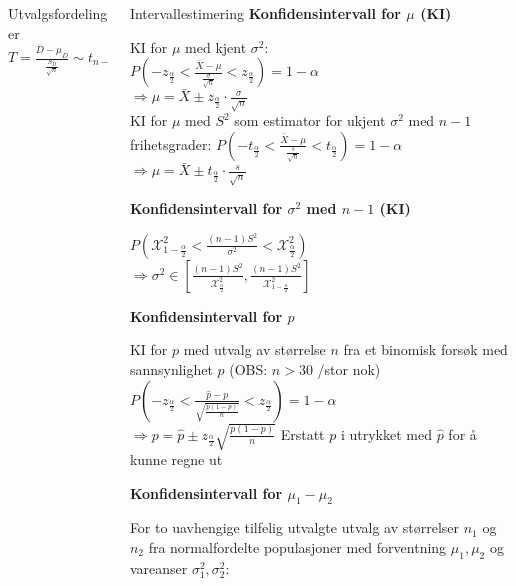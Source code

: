 \documentclass[final,hyperref={pdfpagelabels=false}]{beamer}
\begin{document}
\begin{frame}{}
\begin{columns}[t]
\begin{column}{.25\linewidth}
\begin{block}{\center\normalsize Utvalgsfordelinger}
{					$T=\frac{\bar D - \mu_D}{\frac{S_D}{\sqrt n}}\sim t_{n-1}$
				}
			\end{block}
		\end{column}
		\begin{column}{.25\linewidth}
			\begin{block}{\center Intervallestimering}
				\center\footnotesize\textbf{Konfidensintervall for $\mu$ (KI)}\\
				{\footnotesize\raggedright
					KI for $\mu$ med kjent $\sigma^2$: \\
					$P\left( -z_{\frac{\alpha}{2}} < \frac{\bar X-\mu}{\frac{\sigma}{\sqrt{n}}} < z_{\frac{\alpha}{2}} \right) = 1-\alpha$\\
					$\Rightarrow \mu = \bar X \pm z_{\frac{\alpha}{2}} \cdot\frac{\sigma}{\sqrt{n}}$ \\
					KI for $\mu$ med $S^2$ som estimator for ukjent $\sigma^2$
					med $n-1$ frihetsgrader:
					$P\left( -t_{\frac{\alpha}{2}} < \frac{\bar X-\mu}{\frac{s}{\sqrt{n}}} < t_{\frac{\alpha}{2}} \right) = 1-\alpha $\\ $\Rightarrow \mu = \bar X \pm t_{\frac{\alpha}{2}} \cdot\frac{s}{\sqrt{n}}$ \\
				}
				\center\footnotesize\textbf{Konfidensintervall for $\sigma^2$ med $n-1$ (KI)}\\
				{\footnotesize\raggedright
					$P\left( \mathcal{X}^2_{1-\frac{\alpha}{2}} <\frac{(n-1)S^2}{\sigma^2} < \mathcal{X}^2_{\frac{\alpha}{2}} \right)$ \\
					$\Rightarrow \sigma^2 \in \left[ \frac{(n-1)S^2}{\mathcal{X}^2_{\frac{\alpha}{2}}}, \frac{(n-1)S^2}{\mathcal{X}^2_{1-\frac{\alpha}{2}}} \right]$
				}
				\center\footnotesize\textbf{Konfidensintervall for $p$}\\
				{\footnotesize\raggedright
					KI for $p$ med utvalg av størrelse $n$ fra et binomisk forsøk med sannsynlighet $p$ (OBS: $n>30$ /stor nok)
					$P\left( -z_{\frac{\alpha}{2}} < \frac{\hat p - p}{\sqrt{\frac{p(1-p)}{n}}} < z_{\frac{\alpha}{2}} \right) = 1 - \alpha$ \\ 
					$\Rightarrow p = \hat p \pm z_\frac{\alpha}{2} \sqrt{\frac{p(1-p)}{n}}$
					Erstatt $p$ i utrykket med $\hat p$ for å kunne regne ut\\
				}
				\center\footnotesize\textbf{Konfidensintervall for $\mu_1 - \mu_2$}\\
				{\footnotesize\raggedright
					For to uavhengige tilfelig utvalgte utvalg av størrelser $n_1$ og $n_2$ fra normalfordelte populasjoner med forventning $\mu_1, \mu_2$ og vareanser $\sigma_1^2, \sigma_2^2$: \\
}
\end{block}
\end{column}
\end{columns}
\end{frame}
\end{document}
